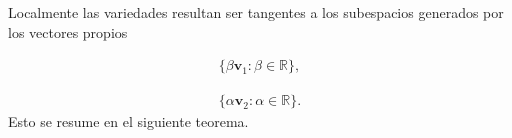 Localmente las variedades resultan ser tangentes a los subespacios generados por los vectores propios

\begin{eqnarray*}
\lbrace \beta \pmb v_{1} : \beta\in \mathbb{R} \rbrace,
\end{eqnarray*}

\begin{eqnarray*}
\lbrace \alpha \pmb v_{2} : \alpha\in \mathbb{R}\rbrace.
\end{eqnarray*}
Esto se resume en el siguiente teorema.








